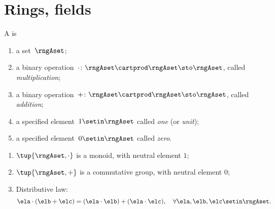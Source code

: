 
\section{Rings, fields}
\label{sec:rings-fields}



\begin{ctdefinition}[Ring]
    \label{def:ring}
    A  is
    \begin{body}
        \constit
        \begin{enumerate}
            \item a set~$\rngAset$;
            \item a binary operation~$\cdot \colon \rngAset \cartprod \rngAset \sto \rngAset$, called \emph{multiplication};
            \item a binary operation~$+ \colon \rngAset \cartprod \rngAset \sto \rngAset$, called \emph{addition};
            \item a specified element~$1 \setin \rngAset$ called \emph{one} (or \emph{unit});
            \item a specified element~$0 \setin \rngAset$ called \emph{zero}.
        \end{enumerate}
        \condit
        \begin{enumerate}
            \item $\tup{\rngAset, \cdot}$ is a monoid, with neutral element $1$;
            \item $\tup{\rngAset, +}$ is a commutative group, with neutral element $0$;
            \item Distributive law:
                  \begin{equation}\label{eq:distributive-law-rings}
                      \ela \cdot (\elb + \elc) = (\ela \cdot \elb) + (\ela \cdot \elc), \quad \forall \ela, \elb, \elc \setin \rngAset.
                  \end{equation}
        \end{enumerate}
    \end{body}
\end{ctdefinition}




